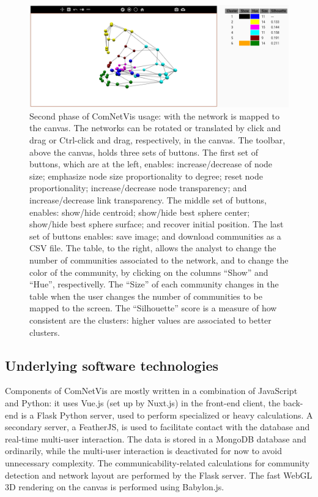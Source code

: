 \documentclass[Afour,sagev,times]{sagej}
\begin{document}
\begin{figure}\centering
 \includegraphics[width=\textwidth]{figs/second}
  \caption{
    Second phase of ComNetVis usage: with the network is mapped to the canvas.
    The networks can be rotated or translated by click and drag or Ctrl-click and drag, respectively, in the canvas.
    The toolbar, above the canvas, holds three sets of buttons.
    The first set of buttons, which are at the left, enables:
    increase/decrease of node size;
    emphasize node size proportionality to degree;
    reset node proportionality;
    increase/decrease node transparency; and
    increase/decrease link transparency.
    The middle set of buttons, enables:
    show/hide centroid;
    show/hide best sphere center;
    show/hide best sphere surface; and
    recover initial position.
    The last set of buttons enables:
    save image; and
    download communities as a CSV file.
    The table, to the right, allows the analyst to change the number of communities associated to the network, and to change the color of the community, by
    clicking on the columns ``Show'' and ``Hue'', respectivelly.
    The ``Size'' of each community changes in the table when the user changes the number of communities to be mapped to the screen.
    The ``Silhouette'' score is a measure of how consistent are the clusters:
    higher values are associated to better clusters.
  }\label{fsecond}
\end{figure}

\subsection{Underlying software technologies}
Components of ComNetVis are mostly written in a combination of JavaScript and Python: it uses Vue.js (set up by Nuxt.js) in the front-end client, the back-end is a Flask Python server, used to perform specialized or heavy calculations.
A secondary server, a FeatherJS, is used to facilitate contact with the database and real-time multi-user interaction.
The data is stored in a MongoDB database and ordinarily,
while the multi-user interaction is deactivated for now to avoid unnecessary complexity.
The communicability-related calculations for community detection and network layout are performed by the Flask server.
The fast WebGL 3D rendering on the canvas is performed using Babylon.js.
\end{document}
